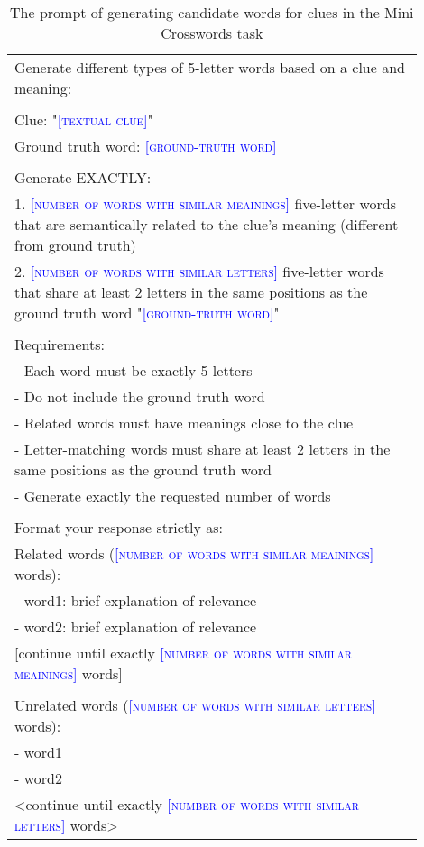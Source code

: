 \begin{table*}[ht]
\small
\centering
\caption{The prompt of generating candidate words for clues in the Mini Crosswords task}
\begin{tabular}{p{0.9\linewidth}} \toprule
Generate different types of 5-letter words based on a clue and meaning:\\
\\
Clue: "\textcolor{blue}{\textsc{[textual clue]}}"\\
Ground truth word: \textcolor{blue}{\textsc{[ground-truth word]}}\\
\\
Generate EXACTLY:\\
1. \textcolor{blue}{\textsc{[number of words with similar meainings]}} five-letter words that are semantically related to the clue's meaning (different from ground truth)\\
2. \textcolor{blue}{\textsc{[number of words with similar letters]}} five-letter words that share at least 2 letters in the same positions as the ground truth word "\textcolor{blue}{\textsc{[ground-truth word]}}"\\
\\
Requirements:\\
- Each word must be exactly 5 letters\\
- Do not include the ground truth word\\
- Related words must have meanings close to the clue\\
- Letter-matching words must share at least 2 letters in the same positions as the ground truth word \\
- Generate exactly the requested number of words\\
\\
Format your response strictly as:\\
Related words (\textcolor{blue}{\textsc{[number of words with similar meainings]}} words):\\
- word1: brief explanation of relevance\\
- word2: brief explanation of relevance\\

[continue until exactly \textcolor{blue}{\textsc{[number of words with similar meainings]}} words]\\
\\
Unrelated words (\textcolor{blue}{\textsc{[number of words with similar letters]}} words):\\
- word1\\
- word2\\
 
<continue until exactly \textcolor{blue}{\textsc{[number of words with similar letters]}} words>
\\\bottomrule
\end{tabular}
\label{tab:crosswords_candidate_generation}
\end{table*}



